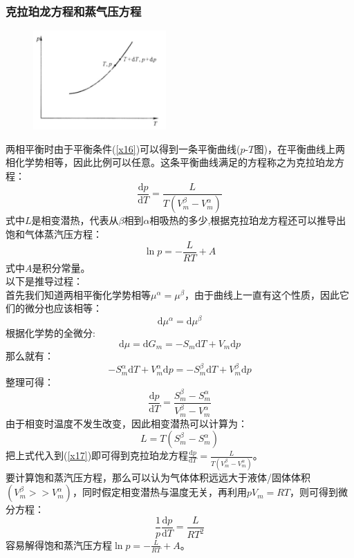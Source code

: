 \documentclass[12pt]{article}
\begin{document}
\subsubsection{克拉珀龙方程和蒸气压方程}
\noindent
\begin{figure}
\begin{center}
	\includegraphics[width=2in]{F5.png}
	\label{F5}
\end{center}
\end{figure}
两相平衡时由于平衡条件(\ref{x16})可以得到一条平衡曲线($p$-$T$图)，在平衡曲线上两相化学势相等，因此比例可以任意。这条平衡曲线满足的方程称之为克拉珀龙方程：
\begin{equation}
\frac{\mathrm{d}p}{\mathrm{d}T}=\frac{L}{T(V_m^\beta-V_m^\alpha)}
\end{equation}
式中$L$是相变潜热，代表从$\beta$相到$\alpha$相吸热的多少,根据克拉珀龙方程还可以推导出饱和气体蒸汽压方程：
\begin{equation}
	\ln p=-\frac{L}{RT}+A
\end{equation}
式中$A$是积分常量。\\
以下是推导过程：\\
首先我们知道两相平衡化学势相等$\mu^\alpha=\mu^\beta$，由于曲线上一直有这个性质，因此它们的微分也应该相等：
\begin{equation}
	\mathrm{d}\mu^\alpha=\mathrm{d}\mu^\beta
\end{equation}
根据化学势的全微分:
\begin{equation}
	\mathrm{d}\mu=\mathrm{d}G_m=-S_m\mathrm{d}T+V_m\mathrm{d}p
\end{equation}
那么就有：
\begin{equation}
	-S_m^\alpha\mathrm{d}T+V_m^\alpha\mathrm{d}p=-S_m^\beta\mathrm{d}T+V_m^\beta\mathrm{d}p
\end{equation}
整理可得：
\begin{equation}
	\frac{\mathrm{d}p}{\mathrm{d}T}=\frac{S_m^\beta-S_m^\alpha}{V_m^\beta-V_m^\alpha}
	\label{x17}
\end{equation}
由于相变时温度不发生改变，因此相变潜热可以计算为：
\begin{equation}
	L=T(S_m^\beta-S_m^\alpha)
\end{equation}
把上式代入到(\ref{x17})即可得到克拉珀龙方程$\frac{\mathrm{d}p}{\mathrm{d}T}=\frac{L}{T(V_m^\beta-V_m^\alpha)}$。\\
要计算饱和蒸汽压方程，那么可以认为气体体积远远大于液体/固体体积$(V_m^\beta>>V_m^\alpha)$，同时假定相变潜热与温度无关，再利用$pV_m=RT$，则可得到微分方程：
\begin{equation}
	\frac{1}{p}\frac{\mathrm{d}p}{\mathrm{d}T}=\frac{L}{RT^2}
\end{equation}
容易解得饱和蒸汽压方程$\ln p=-\frac{L}{RT}+A$。
\end{document}
